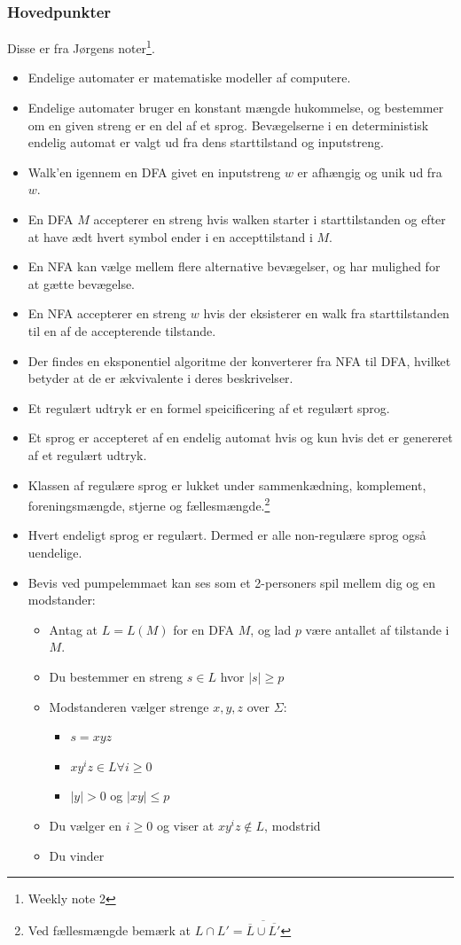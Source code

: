 \begin{frame}[allowframebreaks]
	\frametitle{Hovedpunkter}
	Disse er fra Jørgens noter\footnote{Weekly note 2}.
	\begin{itemize}
		\item Endelige automater er matematiske modeller af computere.
		\item Endelige automater bruger en konstant mængde hukommelse, og bestemmer om en given streng er en del af et sprog. Bevægelserne i en deterministisk endelig automat er valgt ud fra dens starttilstand og inputstreng.
		\item Walk'en igennem en DFA givet en inputstreng $w$ er afhængig og unik ud fra $w$.
		\item En DFA $M$ accepterer en streng hvis walken starter i starttilstanden og efter at have ædt hvert symbol ender i en accepttilstand i $M$.
		\item En NFA kan vælge mellem flere alternative bevægelser, og har mulighed for at gætte bevægelse.
		\item En NFA accepterer en streng $w$ hvis der eksisterer en walk fra starttilstanden til en af de accepterende tilstande.
		\item Der findes en eksponentiel algoritme der konverterer fra NFA til DFA, hvilket betyder at de er ækvivalente i deres beskrivelser.
		\item Et regulært udtryk er en formel speicificering af et regulært sprog.
		\item Et sprog er accepteret af en endelig automat hvis og kun hvis det er genereret af et regulært udtryk.
		\item Klassen af regulære sprog er lukket under sammenkædning, komplement, foreningsmængde,  stjerne og fællesmængde.\footnote{Ved fællesmængde bemærk at $L \cap L' = \overline{\overline{L} \cup \overline{L'}}$}
		\item Hvert endeligt sprog er regulært. Dermed er alle non-regulære sprog også uendelige.
		\item Bevis ved pumpelemmaet kan ses som et 2-personers spil mellem dig og en modstander:
		      \begin{itemize}
			      \item Antag at $L = L(M)$ for en DFA $M$, og lad $p$ være antallet af tilstande i $M$.
			      \item Du bestemmer en streng $s \in L$ hvor $|s| \ge p$
			      \item Modstanderen vælger strenge $x,y,z$ over $\Sigma$:
			            \begin{itemize}
				            \item $s = xyz$
				            \item $xy^{i}z \in L \forall i \ge 0$
				            \item $|y| > 0$ og $|xy| \le p$
			            \end{itemize}
			      \item Du vælger en $i \ge 0$ og viser at $xy^{i}z \notin L$, modstrid
			      \item Du vinder
		      \end{itemize}
	\end{itemize}
\end{frame}


